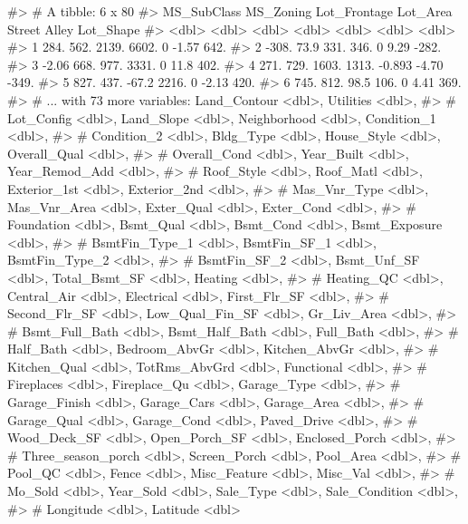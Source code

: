 \begin{Schunk}
\begin{Soutput}
#> # A tibble: 6 x 80
#>   MS_SubClass MS_Zoning Lot_Frontage Lot_Area Street Alley Lot_Shape
#>         <dbl>     <dbl>        <dbl>    <dbl>  <dbl> <dbl>     <dbl>
#> 1      284.       562.        2139.     6602.  0     -1.57      642.
#> 2     -308.        73.9        331.      346.  0      9.29     -282.
#> 3       -2.06     668.         977.     3331.  0     11.8       402.
#> 4      271.       729.        1603.     1313. -0.893 -4.70     -349.
#> 5      827.       437.         -67.2    2216.  0     -2.13      420.
#> 6      745.       812.          98.5     106.  0      4.41      369.
#> # ... with 73 more variables: Land_Contour <dbl>, Utilities <dbl>,
#> #   Lot_Config <dbl>, Land_Slope <dbl>, Neighborhood <dbl>, Condition_1 <dbl>,
#> #   Condition_2 <dbl>, Bldg_Type <dbl>, House_Style <dbl>, Overall_Qual <dbl>,
#> #   Overall_Cond <dbl>, Year_Built <dbl>, Year_Remod_Add <dbl>,
#> #   Roof_Style <dbl>, Roof_Matl <dbl>, Exterior_1st <dbl>, Exterior_2nd <dbl>,
#> #   Mas_Vnr_Type <dbl>, Mas_Vnr_Area <dbl>, Exter_Qual <dbl>, Exter_Cond <dbl>,
#> #   Foundation <dbl>, Bsmt_Qual <dbl>, Bsmt_Cond <dbl>, Bsmt_Exposure <dbl>,
#> #   BsmtFin_Type_1 <dbl>, BsmtFin_SF_1 <dbl>, BsmtFin_Type_2 <dbl>,
#> #   BsmtFin_SF_2 <dbl>, Bsmt_Unf_SF <dbl>, Total_Bsmt_SF <dbl>, Heating <dbl>,
#> #   Heating_QC <dbl>, Central_Air <dbl>, Electrical <dbl>, First_Flr_SF <dbl>,
#> #   Second_Flr_SF <dbl>, Low_Qual_Fin_SF <dbl>, Gr_Liv_Area <dbl>,
#> #   Bsmt_Full_Bath <dbl>, Bsmt_Half_Bath <dbl>, Full_Bath <dbl>,
#> #   Half_Bath <dbl>, Bedroom_AbvGr <dbl>, Kitchen_AbvGr <dbl>,
#> #   Kitchen_Qual <dbl>, TotRms_AbvGrd <dbl>, Functional <dbl>,
#> #   Fireplaces <dbl>, Fireplace_Qu <dbl>, Garage_Type <dbl>,
#> #   Garage_Finish <dbl>, Garage_Cars <dbl>, Garage_Area <dbl>,
#> #   Garage_Qual <dbl>, Garage_Cond <dbl>, Paved_Drive <dbl>,
#> #   Wood_Deck_SF <dbl>, Open_Porch_SF <dbl>, Enclosed_Porch <dbl>,
#> #   Three_season_porch <dbl>, Screen_Porch <dbl>, Pool_Area <dbl>,
#> #   Pool_QC <dbl>, Fence <dbl>, Misc_Feature <dbl>, Misc_Val <dbl>,
#> #   Mo_Sold <dbl>, Year_Sold <dbl>, Sale_Type <dbl>, Sale_Condition <dbl>,
#> #   Longitude <dbl>, Latitude <dbl>
\end{Soutput}
\end{Schunk}

